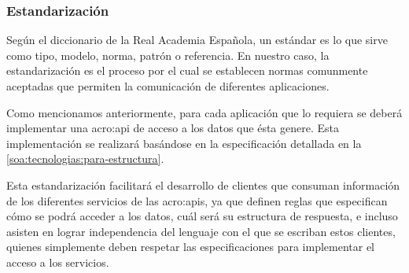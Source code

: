 \subsubsection{Estandarización}

Según el diccionario de la Real Academia Española, un estándar es lo que sirve como tipo, modelo, norma, patrón o referencia. En nuestro caso, la estandarización es el proceso por el cual se establecen normas comunmente aceptadas que permiten la comunicación de diferentes aplicaciones.

Como mencionamos anteriormente, para cada aplicación que lo requiera se deberá implementar una \gls{acro:api} de acceso a los datos que ésta genere. Esta implementación se realizará basándose en la especificación  detallada en la \autoref{soa:tecnologias:para-estructura}.

Esta estandarización facilitará el desarrollo de clientes que consuman información de los diferentes servicios de las \glspl{acro:api}, ya que definen reglas que especifican cómo se podrá acceder a los datos, cuál será su estructura de respuesta, e incluso asisten en lograr independencia del lenguaje con el que se escriban estos clientes, quienes simplemente deben respetar las especificaciones para implementar el acceso a los servicios.
